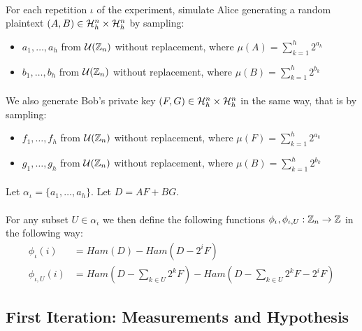 \paragraph{}
For each repetition $\iota$ of the experiment, simulate Alice generating a random plaintext $(A, B) \in \mathcal{H}_h^n \times \mathcal{H}_h^n$ by sampling:
\begin{itemize}
    \item $a_1, \dots, a_h$ from $\mathcal{U}(\mathbb{Z}_n)$ without replacement, where $\mu(A) = \sum_{k=1}^h 2^{a_k}$
    \item $b_1, \dots, b_h$ from $\mathcal{U}(\mathbb{Z}_n)$ without replacement, where $\mu(B) = \sum_{k=1}^h 2^{b_k}$
\end{itemize}

\paragraph{}
We also generate Bob's private key $(F, G) \in \mathcal{H}_h^n \times \mathcal{H}_h^n$ in the same way, that is by sampling:
\begin{itemize}
    \item $f_1, \dots, f_h$ from $\mathcal{U}(\mathbb{Z}_n)$ without replacement, where $\mu(F) = \sum_{k=1}^h 2^{a_k}$
    \item $g_1, \dots, g_h$ from $\mathcal{U}(\mathbb{Z}_n)$ without replacement, where $\mu(B) = \sum_{k=1}^h 2^{b_k}$
\end{itemize}

\paragraph{}
Let $\alpha_\iota = \{a_1, \dots, a_h\}$. Let $D = AF + BG$.

\paragraph{}
For any subset $U \in \alpha_\iota$ we then define the following functions $\phi_\iota, \phi_{\iota, U}: \mathbb{Z}_n \rightarrow \mathbb{Z}$ in the following way:
\begin{align*}
    \phi_\iota(i) &= Ham(D) - Ham(D - 2^i F)\\
    \phi_{\iota, U}(i) &= Ham(D - \sum_{k \in U} 2^k F) - Ham(D - \sum_{k \in U} 2^k F - 2^i F)
\end{align*}

\subsection{First Iteration: Measurements and Hypothesis}

